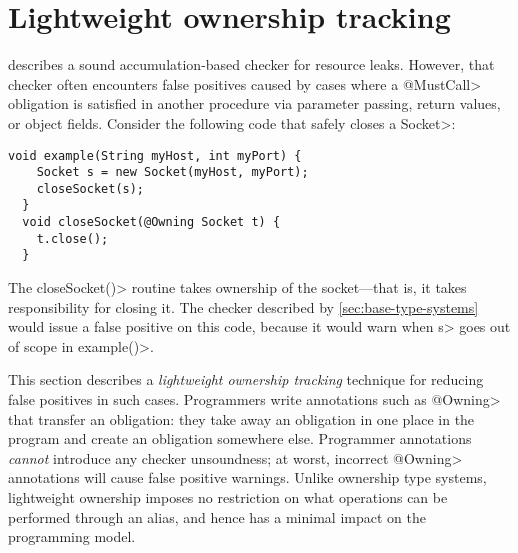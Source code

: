 \section{Lightweight ownership tracking}
\label{sec:lightweight-ownership}



 describes a sound accumulation-based
checker for resource leaks. However, that checker often encounters false
positives caused by cases where a \<@MustCall> obligation is satisfied
in another procedure via parameter passing, return values, or object fields.
Consider the following code that safely closes a \<Socket>:


\begin{lstlisting}[frame=tb,belowskip=3mm]
  void example(String myHost, int myPort) {
    Socket s = new Socket(myHost, myPort);
    closeSocket(s);
  }
  void closeSocket(@Owning Socket t) {
    t.close();
  }  
\end{lstlisting}

The \<closeSocket()> routine takes ownership of the socket---that is,
it takes responsibility for closing it. The checker described by
\cref{sec:base-type-systems} would issue a false positive on this
code, because it would warn when \<s>
goes out of scope in \<example()>.

This section describes a \emph{lightweight ownership tracking} technique for reducing
false positives in such cases.
Programmers write annotations such as \<@Owning> that transfer an
obligation:  they take away an obligation
in one place in the program and create an obligation somewhere else.
Programmer
annotations \emph{cannot} introduce any checker unsoundness; at worst,
incorrect \<@Owning> annotations will cause false positive warnings.
Unlike ownership type systems,
lightweight ownership imposes no restriction on what operations can be performed
through an alias, and hence has a minimal impact on the programming model.

